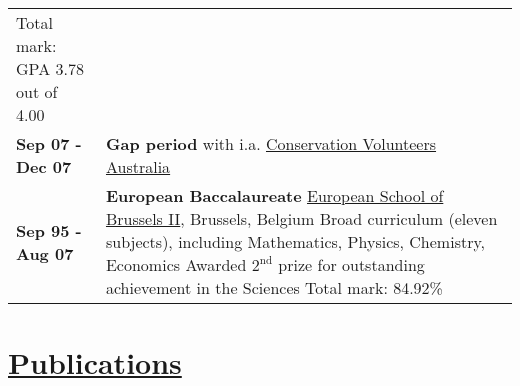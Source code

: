 \documentclass[a4paper,9pt]{extarticle}
\begin{document}
\begin{center}
\begin{tabular}{p{}p{}}
Total mark: GPA 3.78 out of 4.00
\vspace{2mm}\\
\textbf{Sep 07 - Dec 07}&\textbf{Gap period} with i.a. \href{http://conservationvolunteers.com.au}{Conservation Volunteers Australia}
\vspace{2mm}\\
\textbf{Sep 95 - Aug 07}&\textbf{European Baccalaureate}\newline
\href{http://www.eeb2.be/site/}{European School of Brussels II}, Brussels, Belgium\newline
Broad curriculum (eleven subjects), including Mathematics, Physics, Chemistry, Economics\newline
Awarded $2^\text{nd}$ prize for outstanding achievement in the Sciences\newline
Total mark: 84.92\%
\end{tabular}
\end{center}

\vspace{1mm}

\section*{\href{http://www.bogaardt.eu}{Publications}}
\end{document}
